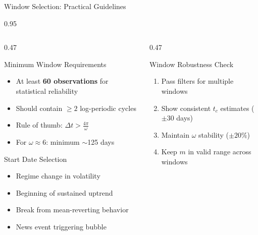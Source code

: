 \documentclass[9pt, aspectratio=169, t]{beamer}
\begin{document}
\begin{frame}{Window Selection: Practical Guidelines}
    \begin{cminipage}{0.95\textwidth}
    {\footnotesize
    \begin{columns}[T]
        \begin{column}{0.47\textwidth}
            \begin{block}{Minimum Window Requirements}
                \begin{itemize}\setlength{\itemsep}{0pt}
                    \item At least \textbf{60 observations} for statistical reliability
                    \item Should contain $\geq 2$ log-periodic cycles
                    \item Rule of thumb: $\Delta t > \frac{4\pi}{\omega}$
                    \item For $\omega \approx 6$: minimum $\sim$125 days
                \end{itemize}
            \end{block}

            \begin{exampleblock}{Start Date Selection}
                \begin{itemize}\setlength{\itemsep}{0pt}
                    \item Regime change in volatility
                    \item Beginning of sustained uptrend
                    \item Break from mean-reverting behavior
                    \item News event triggering bubble
                \end{itemize}
            \end{exampleblock}
        \end{column}
        \begin{column}{0.47\textwidth}
            \begin{alertblock}{Window Robustness Check}
                \begin{enumerate}\setlength{\itemsep}{0pt}
                    \item Pass filters for multiple windows
                    \item Show consistent $t_c$ estimates ($\pm 30$ days)
                    \item Maintain $\omega$ stability ($\pm 20\%$)
                    \item Keep $m$ in valid range across windows
                \end{enumerate}
            \end{alertblock}


\end{column}
\end{columns}}
\end{cminipage}
\end{frame}
\end{document}
